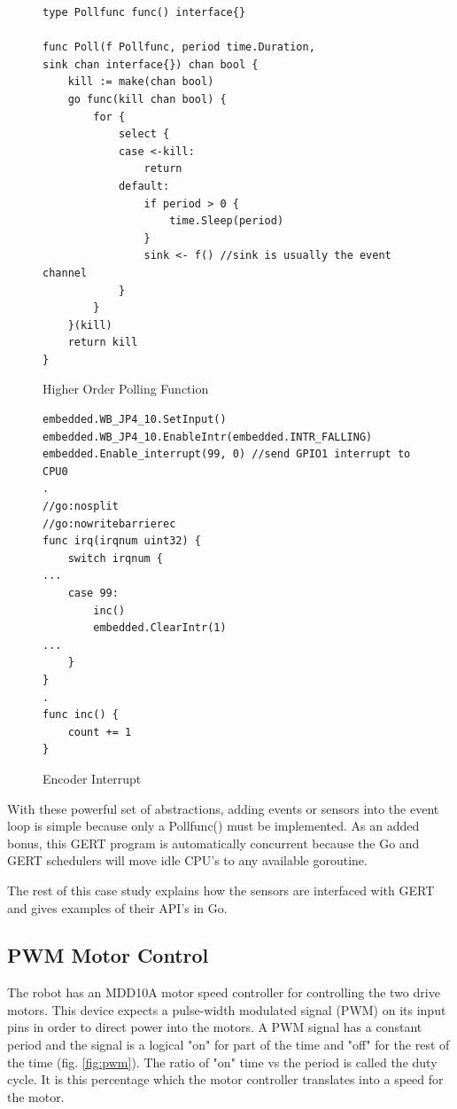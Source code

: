\begin{figure}[!h]
\begin{center}
\begin{lstlisting}
type Pollfunc func() interface{}

func Poll(f Pollfunc, period time.Duration,
sink chan interface{}) chan bool {
	kill := make(chan bool)
	go func(kill chan bool) {
		for {
			select {
			case <-kill:
				return
			default:
				if period > 0 {
					time.Sleep(period)
				}
				sink <- f() //sink is usually the event channel
			}
		}
	}(kill)
	return kill
}
\end{lstlisting}
\end{center}
  \caption{Higher Order Polling Function} \label{fig:poll_func}
\end{figure}


\begin{figure}[!h]
\begin{center}
\begin{lstlisting}
embedded.WB_JP4_10.SetInput()
embedded.WB_JP4_10.EnableIntr(embedded.INTR_FALLING)
embedded.Enable_interrupt(99, 0) //send GPIO1 interrupt to CPU0
.
//go:nosplit
//go:nowritebarrierec
func irq(irqnum uint32) {
	switch irqnum {
...
	case 99:
		inc()
		embedded.ClearIntr(1)
...
	}
}
.
func inc() {
	count += 1
}

\end{lstlisting}
\end{center}
  \caption{Encoder Interrupt} \label{fig:encoder}
\end{figure}

With these powerful set of abstractions, adding events or sensors into the event loop
is simple because only a Pollfunc() must be implemented. As an added bonus, this
GERT program is automatically concurrent because the Go and GERT schedulers will
move idle CPU's to any available goroutine.

The rest of this case study explains how the sensors
are interfaced with GERT and gives examples of their API's in Go.


\subsection{PWM Motor Control}
The robot has an MDD10A motor speed controller for controlling the two drive motors. This device
expects a pulse-width modulated signal (PWM) on its input pins in order to direct power into the
motors. A PWM signal has a constant period and the signal is a logical "on" for part of the time
and "off" for the rest of the time (fig. \ref{fig:pwm}). The ratio of "on" time vs the period is called the duty cycle.
It is this percentage which the motor controller translates into a speed for the motor.

